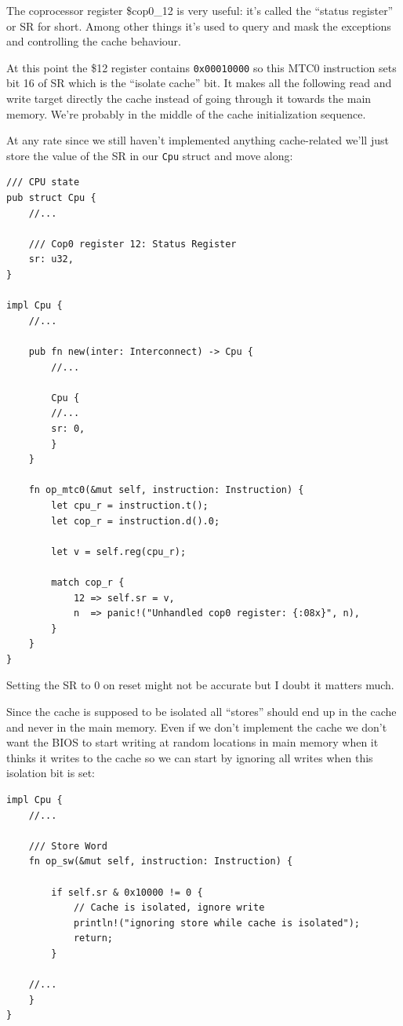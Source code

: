 \documentclass[a4paper]{article}
\newcommand{\code}[1] {\texttt{#1}}
\begin{document}
The coprocessor register \$cop0\_12 is very useful: it's called the
``status register'' or SR for short. Among other things it's used to
query and mask the exceptions and controlling the cache behaviour.

At this point the \$12 register contains \code{0x00010000} so this
MTC0 instruction sets bit 16 of SR which is the ``isolate cache''
bit. It makes all the following read and write target directly the
cache instead of going through it towards the main memory. We're
probably in the middle of the cache initialization sequence.

At any rate since we still haven't implemented anything cache-related
we'll just store the value of the SR in our \code{Cpu} struct and
move along:

\begin{lstlisting}
/// CPU state
pub struct Cpu {
    //...

    /// Cop0 register 12: Status Register
    sr: u32,
}

impl Cpu {
    //...

    pub fn new(inter: Interconnect) -> Cpu {
        //...

        Cpu {
	    //...
	    sr: 0,
        }
    }

    fn op_mtc0(&mut self, instruction: Instruction) {
        let cpu_r = instruction.t();
        let cop_r = instruction.d().0;

        let v = self.reg(cpu_r);

        match cop_r {
            12 => self.sr = v,
            n  => panic!("Unhandled cop0 register: {:08x}", n),
        }
    }
}
\end{lstlisting}

Setting the SR to 0 on reset might not be accurate but I doubt it
matters much.

Since the cache is supposed to be isolated all ``stores'' should end
up in the cache and never in the main memory. Even if we don't
implement the cache we don't want the BIOS to start writing at random
locations in main memory when it thinks it writes to the cache so we
can start by ignoring all writes when this isolation bit is set:

\begin{lstlisting}
impl Cpu {
    //...

    /// Store Word
    fn op_sw(&mut self, instruction: Instruction) {

        if self.sr & 0x10000 != 0 {
            // Cache is isolated, ignore write
            println!("ignoring store while cache is isolated");
            return;
        }

	//...
    }
}
\end{lstlisting}
\end{document}
